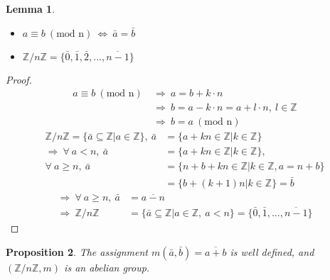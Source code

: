 \documentclass{article}
\newtheorem{theorem}{Proposition}[section]
\newtheorem{lemma}[theorem]{Lemma}
\theoremstyle{definition}
\theoremstyle{remark}
\begin{document}
\begin{lemma}
	\begin{itemize}
		\item $a\equiv b ~(\text{mod n}) ~\Leftrightarrow ~\bar{a}=\bar{b}$
		\item $\mathbb{Z}/n\mathbb{Z} = \lbrace\bar{0}, \bar{1}, \bar{2}, ..., \overline{n-1}\rbrace $
	\end{itemize}
\end{lemma}
\begin{proof}
	\begin{align*}
		a\equiv b~(\text{mod n})~ & \Rightarrow ~ a= b + k\cdot n                                    \\
		                          & \Rightarrow ~ b = a - k\cdot n = a + l\cdot n ,~ l\in \mathbb{Z} \\
		                          & \Rightarrow ~ b=a~(\text{mod n})
	\end{align*}
	\begin{align*}
		\mathbb{Z}/n\mathbb{Z}=\lbrace \bar{a}\subseteq \mathbb{Z}|a\in \mathbb{Z}\rbrace,~ \bar{a} & =\lbrace a + kn \in \mathbb{Z}| k\in \mathbb{Z}\rbrace  \\
		\Rightarrow ~\forall~a<n, ~ \bar{a}                                                         & =\lbrace a + kn \in \mathbb{Z}| k\in \mathbb{Z}\rbrace, \\ \forall ~ a\geq n,~\bar{a}&=\lbrace n+b +kn\in \mathbb{Z}|k\in\mathbb{Z}, a=n+b\rbrace\\
		                                                                                            & =\lbrace b+(k+1)n|k\in\mathbb{Z}\rbrace=\bar{b}
	\end{align*}
	\begin{align*}
		\Rightarrow ~ \forall ~ a\geq n, ~ \bar{a} & =\overline{a-n}                                                                                                         \\
		\Rightarrow  ~ \mathbb{Z}/n\mathbb{Z}      & =\lbrace \bar{a}\subseteq \mathbb{Z}|a\in \mathbb{Z}, ~ a<n\rbrace=\lbrace \bar{0}, \bar{1}, ..., \overline{n-1}\rbrace
	\end{align*}
\end{proof}
\begin{theorem}
	The assignment $m(\bar{a},\bar{b})=\overline{a+b}$ is well defined, and $(\mathbb{Z}/n\mathbb{Z},m) $ is an abelian group.\\
\end{theorem}
\end{document}
